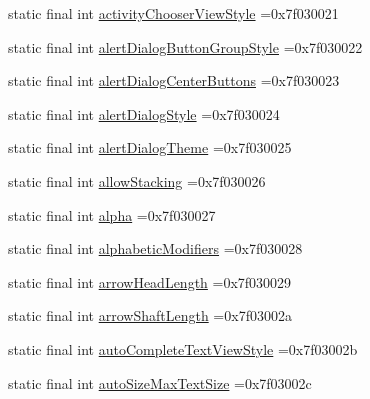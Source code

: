 \begin{DoxyCompactItemize}
\item 
static final int \mbox{\hyperlink{classbr_1_1unb_1_1cic_1_1mp_1_1marketmaster_1_1test_1_1R_1_1attr_a18469baedb15d26c00c5229fc9ce9ae0}{activity\+Chooser\+View\+Style}} =0x7f030021
\item 
static final int \mbox{\hyperlink{classbr_1_1unb_1_1cic_1_1mp_1_1marketmaster_1_1test_1_1R_1_1attr_a09653e8fd9914f143554b886950d2ab5}{alert\+Dialog\+Button\+Group\+Style}} =0x7f030022
\item 
static final int \mbox{\hyperlink{classbr_1_1unb_1_1cic_1_1mp_1_1marketmaster_1_1test_1_1R_1_1attr_adb89f9c9839691e3d20154090261811f}{alert\+Dialog\+Center\+Buttons}} =0x7f030023
\item 
static final int \mbox{\hyperlink{classbr_1_1unb_1_1cic_1_1mp_1_1marketmaster_1_1test_1_1R_1_1attr_a3f44aaa3843382d3ee5677c237aa7718}{alert\+Dialog\+Style}} =0x7f030024
\item 
static final int \mbox{\hyperlink{classbr_1_1unb_1_1cic_1_1mp_1_1marketmaster_1_1test_1_1R_1_1attr_a9ed8924812a240a1f8b3e320ce2f44d9}{alert\+Dialog\+Theme}} =0x7f030025
\item 
static final int \mbox{\hyperlink{classbr_1_1unb_1_1cic_1_1mp_1_1marketmaster_1_1test_1_1R_1_1attr_ad2c3e7d08e87a2296a0b759f183aded0}{allow\+Stacking}} =0x7f030026
\item 
static final int \mbox{\hyperlink{classbr_1_1unb_1_1cic_1_1mp_1_1marketmaster_1_1test_1_1R_1_1attr_a15bac60f11a6f0a3e15cf80e402b4abd}{alpha}} =0x7f030027
\item 
static final int \mbox{\hyperlink{classbr_1_1unb_1_1cic_1_1mp_1_1marketmaster_1_1test_1_1R_1_1attr_a3ee8df883c92a287af6a3d961331ba1b}{alphabetic\+Modifiers}} =0x7f030028
\item 
static final int \mbox{\hyperlink{classbr_1_1unb_1_1cic_1_1mp_1_1marketmaster_1_1test_1_1R_1_1attr_ae71d6a2d7cc1d74b6a2ad61e9ef70fe2}{arrow\+Head\+Length}} =0x7f030029
\item 
static final int \mbox{\hyperlink{classbr_1_1unb_1_1cic_1_1mp_1_1marketmaster_1_1test_1_1R_1_1attr_a71b1c478dc4286522e9055b8d07fff32}{arrow\+Shaft\+Length}} =0x7f03002a
\item 
static final int \mbox{\hyperlink{classbr_1_1unb_1_1cic_1_1mp_1_1marketmaster_1_1test_1_1R_1_1attr_a00c55e3a9f2d6162f6f88fc6dd3dbecc}{auto\+Complete\+Text\+View\+Style}} =0x7f03002b
\item 
static final int \mbox{\hyperlink{classbr_1_1unb_1_1cic_1_1mp_1_1marketmaster_1_1test_1_1R_1_1attr_a56ac8a40aadd7ae50668e7139e6d68fd}{auto\+Size\+Max\+Text\+Size}} =0x7f03002c

\end{DoxyCompactItemize}
